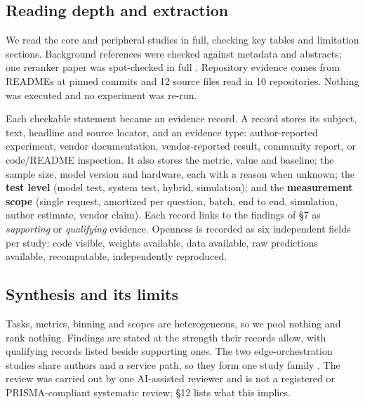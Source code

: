 \subsection{Reading depth and extraction}

We read the core and peripheral studies in full, checking key tables and limitation sections. Background references were checked against metadata and abstracts; one reranker paper was spot-checked in full \citep{arxiv2606_22807}. Repository evidence comes from READMEs at pinned commits and 12 source files read in 10 repositories. Nothing was executed and no experiment was re-run.

Each checkable statement became an evidence record. A record stores its subject, text, headline and source locator, and an evidence type: author-reported experiment, vendor documentation, vendor-reported result, community report, or code/README inspection. It also stores the metric, value and baseline; the sample size, model version and hardware, each with a reason when unknown; the \textbf{test level} (model test, system test, hybrid, simulation); and the \textbf{measurement scope} (single request, amortized per question, batch, end to end, simulation, author estimate, vendor claim). Each record links to the findings of §7 as \emph{supporting} or \emph{qualifying} evidence. Openness is recorded as six independent fields per study: code visible, weights available, data available, raw predictions available, recomputable, independently reproduced.

\subsection{Synthesis and its limits}

Tasks, metrics, binning and scopes are heterogeneous, so we pool nothing and rank nothing. Findings are stated at the strength their records allow, with qualifying records listed beside supporting ones. The two edge-orchestration studies share authors and a service path, so they form one study family \citep{arxiv2609_23136,arxiv2609_22753}. The review was carried out by one AI-assisted reviewer and is not a registered or PRISMA-compliant systematic review; §12 lists what this implies.
